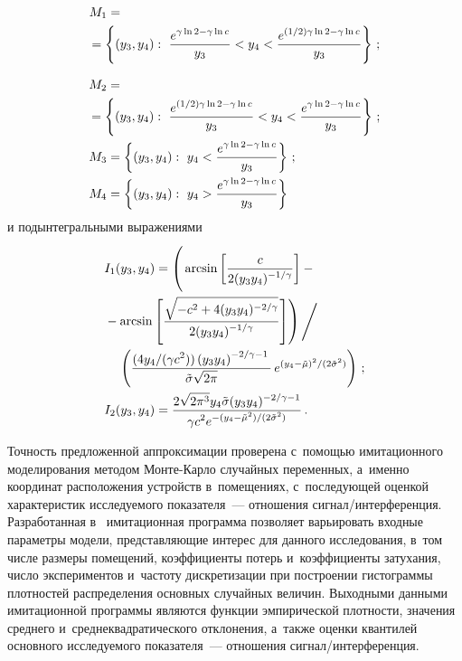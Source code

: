 \begin{multicols}{2}
\noindent
\begin{align*}
M_1&={}\\
&\hspace*{-15pt}{}=\left\{ (y_3,y_4):\ \fr{e^{\gamma\ln 2-\gamma \ln c}}{y_3}<y_4<
\fr{e^{(1/2)\gamma\ln 2-\gamma\ln c}}{y_3}\right\}\,;
\end{align*}

\noindent
\begin{align*}
M_2&={}\\
&\hspace*{-15pt}{}=\left\{ (y_3,y_4):\ \fr{e^{(1/2)\gamma\ln 2-\gamma \ln c}}{y_3}<y_4<
\fr{e^{\gamma\ln 2-\gamma\ln c}}{y_3}\right\}\,;\\
M_3&=\left\{ (y_3,y_4):\ y_4<\fr{e^{\gamma\ln 2-\gamma \ln c}}{y_3}\right\}\,;\\
M_4&=\left\{ (y_3,y_4):\ y_4>\fr{e^{\gamma\ln 2-\gamma \ln c}}{y_3}\right\}
\end{align*}
и подынтегральными выражениями
\begin{align*}
I_1(y_3,y_4)&=
\left( \vphantom{\left[ \fr{\sqrt{-c^2+4(y_3 y_4)^{-2/\gamma}}}
{2(y_3 y_4)^{-1/\gamma}}\right]}
\arcsin\left[
\fr{c}{2(y_3 y_4)^{-1/\gamma}}
\right] -{}\right.\\
&\left.\hspace*{-15mm}{}-\arcsin\left[ \fr{\sqrt{-c^2+4(y_3 y_4)^{-2/\gamma}}}
{2(y_3 y_4)^{-1/\gamma}}\right]\right) \Bigg/ \\
&\hspace*{-10mm}\left(\fr{(4y_4/(\gamma c^2))\left(y_3 y_4\right)^{-2/\gamma-1}}
{\tilde{\sigma}\sqrt{2\pi}}\,e^{(y_4-\tilde{\mu})^2/(2\tilde{\sigma}^2)}\right)\,;\\
I_2(y_3,y_4) &= \fr{2\sqrt{2\pi^3}y_4 \tilde{\sigma}(y_3 y_4)^{-2/\gamma-1}}
{\gamma c^2 e^{-(y_4-\tilde{\mu}^2)/(2\tilde{\sigma}^2)}}\,.
\end{align*}

  
  Точность предложенной аппроксимации проверена с~по\-мощью 
имитационного моделирования методом Мон\-те-Кар\-ло случайных 
переменных, а~именно координат расположения устройств в~помещениях, 
с~последующей оценкой характеристик исследуемого показателя~--- 
отношения сиг\-нал/ин\-тер\-фе\-рен\-ция. Разработанная в~\cite{13-gai} 
имитационная программа позволяет варьировать входные па\-ра\-мет\-ры модели, 
представляющие интерес для данного исследования, в~том числе размеры 
помещений, коэффициенты потерь и~коэффициенты затухания, число 
экспериментов и~час\-то\-ту дискретизации при построении гистограммы 
плотностей распределения основных случайных величин. Выходными 
данными имитационной программы являются функции эмпирической 
плотности, значения среднего и~среднеквадратического отклонения, а~также 
оценки квантилей основного исследуемого показателя~--- отношения  
сиг\-нал/ин\-тер\-фе\-рен\-ция.


\end{multicols}
